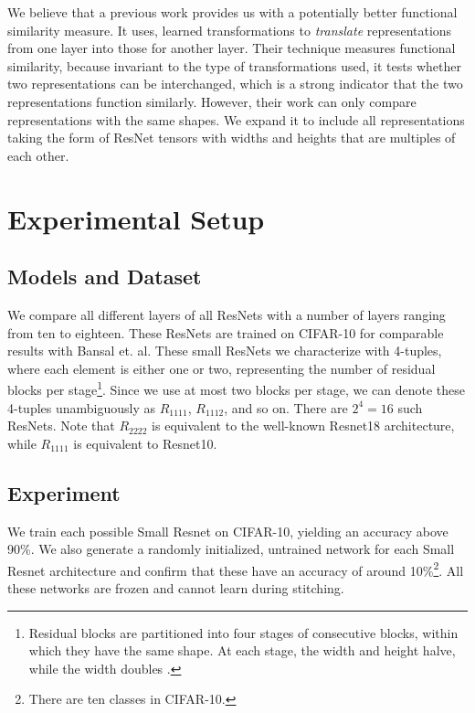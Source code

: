 \documentclass{article}
\begin{document}
We believe that a previous work \cite{Bansal2021RevisitingMS} provides us with a potentially better functional similarity 
measure. It uses, learned transformations to \textit{translate} representations from one layer into those for another
layer. Their technique measures functional similarity, because invariant to the type of transformations used,
it tests whether two representations can be interchanged, which is a strong indicator that the two representations
function similarly. However, their work can only
compare representations with the same shapes.
We expand it to include all representations taking the form of
ResNet tensors with widths and heights that are multiples of each other.

\section{Experimental Setup}
\label{ExperimentalSetup}
\subsection{Models and Dataset}
We compare all different
layers of all ResNets with a number of layers ranging from ten to eighteen.
These ResNets are trained on CIFAR-10 for comparable results
with Bansal et. al. These small ResNets we characterize with 4-tuples, where 
each element is either one or two, representing the number of residual blocks per stage\footnote{
   Residual blocks are partitioned into four stages of consecutive blocks, within which they have the same shape. At each stage, the
   width and height halve, while the width doubles \cite{He2016DeepRL}.
}. Since we use at most two blocks per stage, we can denote these 4-tuples unambiguously as
$R_{1111}$, $R_{1112}$, and so on. There are $2^4 = 16$ such ResNets. Note that $R_{2222}$ is equivalent
to the well-known Resnet18 architecture, while $R_{1111}$ is equivalent to Resnet10.

\subsection{Experiment}
We train each possible Small Resnet on CIFAR-10, yielding an accuracy above 90\%. We also
generate a randomly initialized, untrained network for each Small Resnet architecture and confirm
that these have an accuracy of around 10\%\footnote{There are ten classes in CIFAR-10.}. All these
networks are frozen and cannot learn during stitching.
\end{document}
